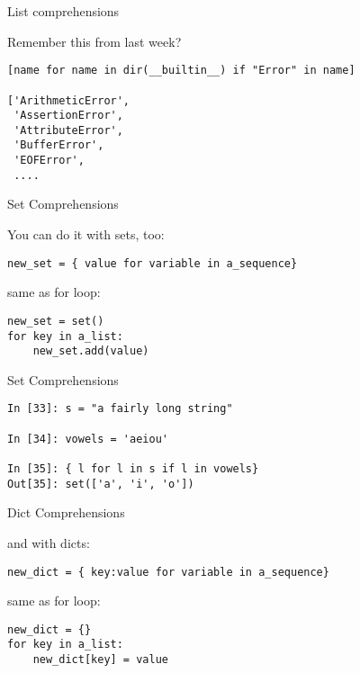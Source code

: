 \documentclass{beamer}
\begin{document}
\begin{frame}[fragile]{List comprehensions}

{\Large Remember this from last week?}

\begin{verbatim}
[name for name in dir(__builtin__) if "Error" in name]

['ArithmeticError',
 'AssertionError',
 'AttributeError',
 'BufferError',
 'EOFError',
 ....
\end{verbatim}

\end{frame} 

\begin{frame}[fragile]{Set Comprehensions}

{\Large You can do it with sets, too:}

\begin{verbatim}
new_set = { value for variable in a_sequence}
\end{verbatim}

{\Large same as for loop:}

\begin{verbatim}
new_set = set()
for key in a_list:
    new_set.add(value)
\end{verbatim}

\end{frame} 

\begin{frame}[fragile]{Set Comprehensions}


\begin{verbatim}
In [33]: s = "a fairly long string"

In [34]: vowels = 'aeiou'

In [35]: { l for l in s if l in vowels}
Out[35]: set(['a', 'i', 'o'])
\end{verbatim}

\end{frame} 



\begin{frame}[fragile]{Dict Comprehensions}

{\Large and with dicts:}

\begin{verbatim}
new_dict = { key:value for variable in a_sequence}
\end{verbatim}

{\Large same as for loop:}

\begin{verbatim}
new_dict = {}
for key in a_list:
    new_dict[key] = value
\end{verbatim}

\end{frame} 
\end{document}
